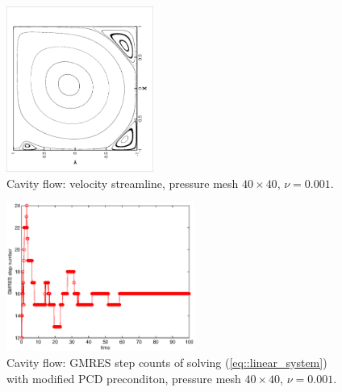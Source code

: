        \begin{figure}[!htbp]
         \begin{center}
             \includegraphics[width = 0.43\textwidth, angle = -90]{picture/second/cavity_flow_data/streamline.eps}
        \end{center}
        \caption{\small Cavity flow: velocity streamline, pressure
          mesh $40 \times 40$, $\nu = 0.001$.}
        \label{fig::cavity_flow_streamline}
       \end{figure}

       \begin{figure}[!htbp]
         \begin{center}
             \includegraphics[width = 0.55\textwidth, angle = 0]{picture/second/cavity_flow_data/NS_iterate_steps.eps}
        \end{center}
        \caption{\small Cavity flow: GMRES step counts of solving
          (\ref{eq::linear_system}) with modified PCD preconditon,
          pressure mesh $40 \times 40$, $\nu = 0.001$.}
        \label{fig::cavity_GMRES_steps}
       \end{figure}

